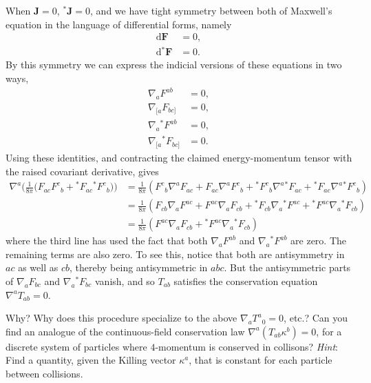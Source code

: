 \documentclass[../road-to-reality.tex]{subfiles}
\begin{document}
\begin{questions}
  \begin{solution}
    When $\mathbf{J}=0$, ${}^*\mathbf{J}=0$, and we have tight symmetry between both of Maxwell's
    equation in the language of differential forms, namely
    \begin{align*}
      \mathrm{d}\mathbf{F} &= 0, \\
      \mathrm{d}{}^*\mathbf{F} &= 0.
    \end{align*}
    By this symmetry we can express the indicial versions of these equations in two ways,
    \begin{align*}
      \nabla_aF^{ab} &= 0, \\
      \nabla_{[a}F_{bc]} &= 0, \\
      \nabla_a{}^*F^{ab} &= 0, \\
      \nabla_{[a}{}^*F_{bc]} &= 0.
    \end{align*}
    Using these identities, and contracting the claimed energy-momentum tensor with the raised covariant
    derivative, gives
    \begin{align*}
      \nabla^a\Big(\frac{1}{8\pi}\big(F_{ac}{F^c}_b + {}^*F_{ac}{}^*{F^c}_b\big)\Big) &= \frac{1}{8\pi}({F^c}_b\nabla^aF_{ac} + F_{ac}\nabla^a{F^c}_b + {}^*{F^c}_b\nabla^a{}^*F_{ac} + {}^*F_{ac}\nabla^a{}^*{F^c}_b) \\
                                                                                      &= \frac{1}{8\pi}(F_{cb}\nabla_aF^{ac} + F^{ac}\nabla_aF_{cb} + {}^*F_{cb}\nabla_a{}^*F^{ac} + {}^*F^{ac}\nabla_a{}^*F_{cb}) \\
                                                                                      &= \frac{1}{8\pi}(F^{ac}\nabla_aF_{cb} + {}^*F^{ac}\nabla_a{}^*F_{cb})
    \end{align*}
    where the third line has used the fact that both $\nabla_aF^{ab}$ and
    $\nabla_a{}^*F^{ab}$ are zero. The remaining terms are also zero. To see
    this, notice that both are antisymmetry in $ac$ as well as $cb$, thereby
    being antisymmetric in $abc$. But the antisymmetric parts of
    $\nabla_aF_{bc}$ and $\nabla_a{}^*F_{bc}$ vanish, and so $T_{ab}$ satisfies
    the conservation equation $\nabla^aT_{ab}=0$.
  \end{solution}

\question Why? Why does this procedure specialize to the above
  $\nabla_a{T^a}_0=0$, etc.? Can you find an analogue of the continuous-field
  conservation law $\nabla^a(T_{ab}\kappa^b)=0$, for a discrete system of
  particles where $4$-momentum is conserved in collisons? \textit{Hint}: Find
  a quantity, given the Killing vector $\kappa^a$, that is constant for each
  particle between collisions.


\end{questions}
\end{document}
